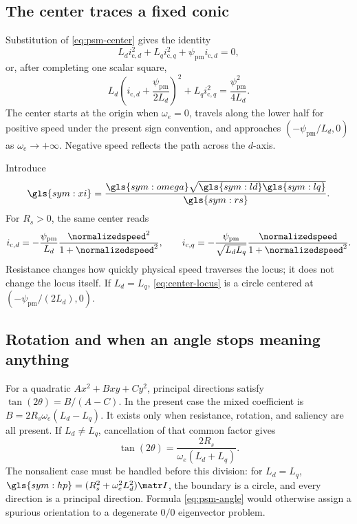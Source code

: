 \subsection{The center traces a fixed conic}

Substitution of \cref{eq:psm-center} gives the identity
\begin{equation}
 L_di_{\mathrm c,d}^2+L_qi_{\mathrm c,q}^2
 +\psi_{\mathrm{pm}}i_{\mathrm c,d}=0,
 \label{eq:center-locus-raw}
\end{equation}
or, after completing one scalar square,
\begin{equation}
 \boxed{L_d\left(i_{\mathrm c,d}+\frac{\psi_{\mathrm{pm}}}{2L_d}\right)^2
 +L_qi_{\mathrm c,q}^2=\frac{\psi_{\mathrm{pm}}^2}{4L_d}.}
 \label{eq:center-locus}
\end{equation}
The center starts at the origin when \(\omega_e=0\), travels along the lower
half for positive speed under the present sign convention, and approaches
\((-\psi_{\mathrm{pm}}/L_d,0)\) as \(\omega_e\to+\infty\). Negative speed
reflects the path across the \(d\)-axis.

Introduce
\begin{equation}
 \gls{sym:xi}=\frac{\gls{sym:omega}\sqrt{\gls{sym:ld}\gls{sym:lq}}}
 {\gls{sym:rs}}.
\end{equation}
For \(R_s>0\), the same center reads
\begin{equation}
 i_{\mathrm c,d}=-\frac{\psi_{\mathrm{pm}}}{L_d}
 \frac{\normalizedspeed^2}{1+\normalizedspeed^2},\qquad
 i_{\mathrm c,q}=-\frac{\psi_{\mathrm{pm}}}{\sqrt{L_dL_q}}
 \frac{\normalizedspeed}{1+\normalizedspeed^2}.
 \label{eq:center-dimensionless}
\end{equation}
Resistance changes how quickly physical speed traverses the locus; it does not
change the locus itself. If \(L_d=L_q\), \cref{eq:center-locus} is a circle
centered at \((-\psi_{\mathrm{pm}}/(2L_d),0)\).



\subsection{Rotation and when an angle stops meaning anything}

For a quadratic \(Ax^2+Bxy+Cy^2\), principal directions satisfy
\(\tan(2\theta)=B/(A-C)\). In the present case the mixed coefficient is
\(B=2R_s\omega_e(L_d-L_q)\). It exists only when resistance, rotation, and
saliency are all present. If \(L_d\neq L_q\), cancellation of that common
factor gives
\begin{equation}
 \boxed{\tan(2\theta)=\frac{2R_s}{\omega_e(L_d+L_q)}.}
 \label{eq:psm-angle}
\end{equation}
The nonsalient case must be handled before this division: for \(L_d=L_q\),
\(\gls{sym:hp}=(R_s^2+\omega_e^2L_d^2)\matr I\), the boundary is a circle,
and every direction is a principal direction. Formula
\cref{eq:psm-angle} would otherwise assign a spurious orientation to a
degenerate \(0/0\) eigenvector problem.

